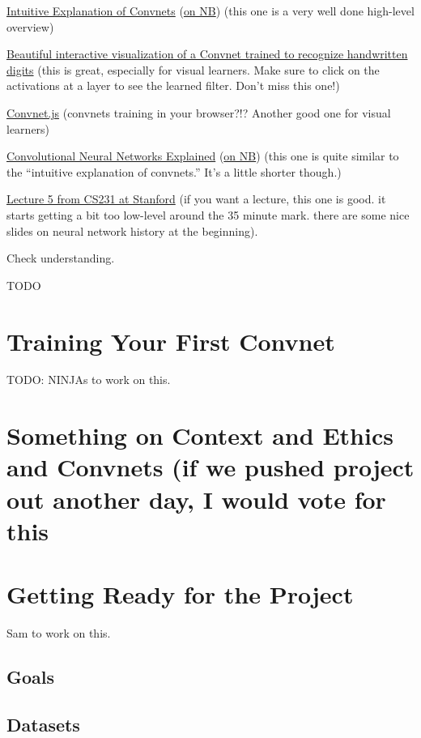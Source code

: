 \documentclass[assignment07_Solutions]{subfiles}
\begin{document}
\begin{externalresources}[(60 minutes)]
\bi
\item \href{https://ujjwalkarn.me/2016/08/11/intuitive-explanation-convnets/}{Intuitive Explanation of Convnets} (\href{http://nb.mit.edu/f/55489}{on NB}) (this one is a very well done high-level overview)
\item \href{http://scs.ryerson.ca/~aharley/vis/conv/flat.html}{Beautiful interactive visualization of a Convnet trained to recognize handwritten digits} (this is great, especially for visual learners.  Make sure to click on the activations at a layer to see the learned filter.  Don't miss this one!)
\item \href{https://cs.stanford.edu/people/karpathy/convnetjs/}{Convnet.js} (convnets training in your browser?!? Another good one for visual learners)
\item \href{https://www.datascience.com/blog/convolutional-neural-network}{Convolutional Neural Networks Explained} (\href{http://nb.mit.edu/f/55488}{on NB}) (this one is quite similar to the ``intuitive explanation of convnets.''  It's a little shorter though.)
\item \href{https://www.youtube.com/watch?v=bNb2fEVKeEo&list=PL3FW7Lu3i5JvHM8ljYj-zLfQRF3EO8sYv\&index=5}{Lecture 5 from CS231 at Stanford} (if you want a lecture, this one is good.  it starts getting a bit too low-level around the 35 minute mark.  there are some nice slides on neural network history at the beginning).
\ei
\end{externalresources}

\begin{exercise}
Check understanding.

\bes
\item TODO
\ees
\end{exercise}

\section{Training Your First Convnet}

TODO: NINJAs to work on this.

\section{Something on Context and Ethics and Convnets (if we pushed project out another day, I would vote for this}

\section{Getting Ready for the Project}
Sam to work on this.
\subsection{Goals}
\subsection{Datasets}
\end{document}
